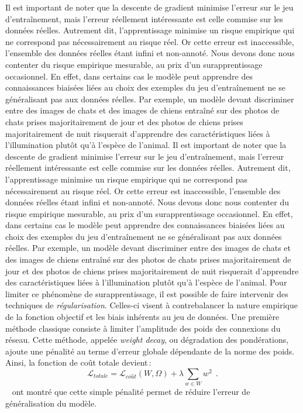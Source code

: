 Il est important de noter que la descente de gradient minimise l'erreur sur le jeu d'entraînement, mais l'erreur réellement intéressante est celle commise sur les données réelles. Autrement dit, l'apprentissage minimise un risque empirique qui ne correspond pas nécessairement au risque réel. Or cette erreur est inaccessible, l'ensemble des données réelles étant infini et non-annoté. Nous devons donc nous contenter du risque empirique mesurable, au prix d'un surapprentissage occasionnel. En effet, dans certains cas le modèle peut apprendre des connaissances biaisées liées au choix des exemples du jeu d'entraînement ne se généralisant pas aux données réelles. Par exemple, un modèle devant discriminer entre des images de chats et des images de chiens entraîné sur des photos de chats prises majoritairement de jour et des photos de chiens prises majoritairement de nuit risquerait d'apprendre des caractéristiques liées à l'illumination plutôt qu'à l'espèce de l'animal.
Il est important de noter que la descente de gradient minimise l'erreur sur le jeu d'entraînement, mais l'erreur réellement intéressante est celle commise sur les données réelles. Autrement dit, l'apprentissage minimise un risque empirique qui ne correspond pas nécessairement au risque réel. Or cette erreur est inaccessible, l'ensemble des données réelles étant infini et non-annoté. Nous devons donc nous contenter du risque empirique mesurable, au prix d'un surapprentissage occasionnel. En effet, dans certains cas le modèle peut apprendre des connaissances biaisées liées au choix des exemples du jeu d'entraînement ne se généralisant pas aux données réelles. Par exemple, un modèle devant discriminer entre des images de chats et des images de chiens entraîné sur des photos de chats prises majoritairement de jour et des photos de chiens prises majoritairement de nuit risquerait d'apprendre des caractéristiques liées à l'illumination plutôt qu'à l'espèce de l'animal.
Pour limiter ce phénomène de surapprentissage, il est possible de faire intervenir des techniques de \emph{régularisation}. Celles-ci visent à contrebalancer la nature empirique de la fonction objectif et les biais inhérents au jeu de données. Une première méthode classique consiste à limiter l'amplitude des poids des connexions du réseau. Cette méthode, appelée \emph{weight decay}, ou dégradation des pondérations, ajoute une pénalité au terme d'erreur globale dépendante de la norme des poids. Ainsi, la fonction de coût totale devient\,:
$$\mathcal{L}_{totale} = \mathcal{L}_{co\hat{u}t}(W, \Omega) + \lambda \sum_{w \in W} w^2~~.$$
~\citet{krogh_simple_1991} ont montré que cette simple pénalité permet de réduire l'erreur de généralisation du modèle.

